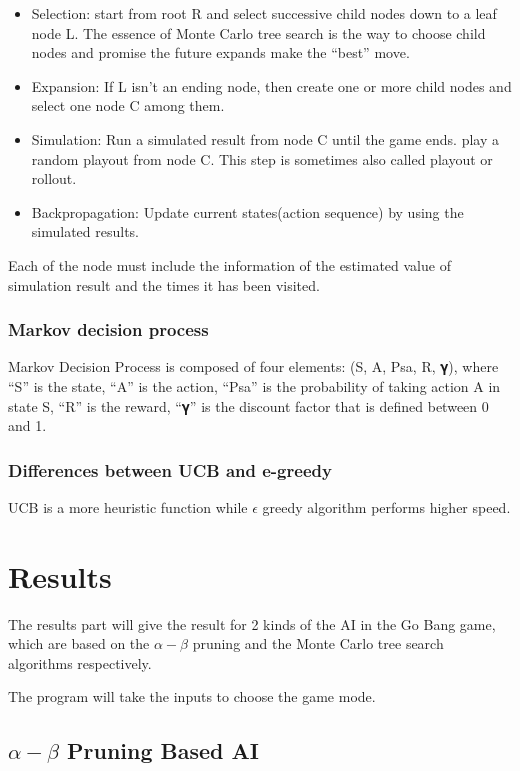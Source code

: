 \documentclass[11pt, a4paper]{article}
\begin{document}
\begin{itemize}
\item Selection: start from root R and select successive child nodes down to a leaf node L. The essence of Monte Carlo tree search is the way to choose child nodes and promise the future expands make the “best” move.
\item Expansion: If L isn’t an ending node, then create one or more child nodes and select one node C among them.
\item Simulation: Run a simulated result from node C until the game ends. play a random playout from node C. This step is sometimes also called playout or rollout.
\item Backpropagation: Update current states(action sequence) by using the simulated results.

\end{itemize}

Each of the node must include the information of the estimated value of simulation result and the times it has been visited.

\subsubsection{Markov decision process}

Markov Decision Process is composed of four elements: (S, A, Psa, R, 𝛄), where “S” is the state, “A” is the action, “Psa” is the probability of taking action A in state S, “R” is the reward, “𝛄” is the discount factor that is defined between 0 and 1.

\subsubsection{Differences between UCB and e-greedy}

UCB is a more heuristic function while $\epsilon$ greedy algorithm performs higher speed.

\section{Results}

The results part will give the result for 2 kinds of the AI in the Go Bang game, which are based on the $\alpha-\beta$ pruning and the Monte Carlo tree search algorithms respectively.  

The program will take the inputs to choose the game mode.

\subsection{$\alpha-\beta$ Pruning Based AI}
\end{document}

